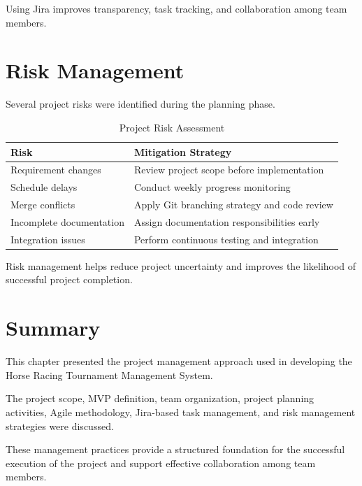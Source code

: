 Using Jira improves transparency, task tracking, and collaboration among team members.

\section{Risk Management}

Several project risks were identified during the planning phase.

\begin{table}[H]
	\centering
	\caption{Project Risk Assessment}
	\begin{tabular}{|p{5cm}|p{7cm}|}
		\hline
		\textbf{Risk} & \textbf{Mitigation Strategy} \\
		\hline
		Requirement changes & Review project scope before implementation \\
		\hline
		Schedule delays & Conduct weekly progress monitoring \\
		\hline
		Merge conflicts & Apply Git branching strategy and code review \\
		\hline
		Incomplete documentation & Assign documentation responsibilities early \\
		\hline
		Integration issues & Perform continuous testing and integration \\
		\hline
	\end{tabular}
\end{table}

Risk management helps reduce project uncertainty and improves the likelihood of successful project completion.

\section{Summary}

This chapter presented the project management approach used in developing the Horse Racing Tournament Management System.

The project scope, MVP definition, team organization, project planning activities, Agile methodology, Jira-based task management, and risk management strategies were discussed.

These management practices provide a structured foundation for the successful execution of the project and support effective collaboration among team members.
